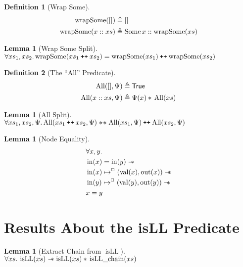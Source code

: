 \documentclass[a4paper, 10pt]{report}
\theoremstyle{definition}
\newtheorem{lemma}[theorem]{Lemma}
\newtheorem{definition}{Definition}[section]
\newcommand{\isLLchain}{\operatorname{isLL\_chain}}
\newcommand{\isLL}{\operatorname{isLL}}
\newcommand{\AllP}{\operatorname{All}}
\newcommand{\wrapsome}{\operatorname{wrapSome}}
\newcommand{\nIn}[1]{\operatorname{in}(#1)}
\newcommand{\nVal}[1]{\operatorname{val}(#1)}
\newcommand{\nOut}[1]{\operatorname{out}(#1)}
\newcommand\catenate{\mathbin{\text{\ttfamily\upshape ++}}}
\newcommand{\isNode}[1]{\nIn{#1} \mapsto^{\persistently} (\nVal{#1}, \nOut{#1})}
\begin{document}
\begin{definition}[Wrap Some]\label{COMMON:Def:wrap-some}
  \begin{align*}
    \wrapsome([]) &\eqdef []\\
    \wrapsome(x :: xs) &\eqdef \Some{x} :: \wrapsome(xs)
  \end{align*}
\end{definition}

\begin{lemma}[Wrap Some Split]\label{lemma:wrap-some-split}
  $\All xs_1, xs_2.\\
  \wrapsome(xs_1 \catenate xs_2) = \wrapsome(xs_1) \catenate \wrapsome(xs_2)$
\end{lemma}


\begin{definition}[The ``All'' Predicate]\label{COMMON:Def:All}
  \begin{align*}
    \AllP([], \Psi) &\eqdef \TRUE\\
    \AllP(x :: xs, \Psi) &\eqdef \Psi(x) \star{} \AllP(xs)
  \end{align*}
\end{definition}

\begin{lemma}[All Split]\label{lemma:all-split}
  $\All xs_1, xs_2, \Psi.\\
  \AllP(xs_1 \catenate xs_2, \Psi) \wandIff \AllP(xs_1, \Psi) \catenate \AllP(xs_2, \Psi)$
\end{lemma}


\begin{lemma}[Node Equality]\label{lemma:nIn-equal}
  \begin{align*}
    &\All x, y.\\
    &\nIn{x} = \nIn{y} \wand\\
    &\isNode{x} \wand\\
    &\isNode{y} \wand\\
    &x = y
  \end{align*}
\end{lemma}

\section{Results About the isLL Predicate}
\label{appendix:common:section:isll}

\begin{lemma}[Extract Chain from $\isLL$]\label{lemma:isLL-and-chain}
  $\All xs. \isLL(xs) \wand \isLL(xs) \star{} \isLLchain(xs)$
\end{lemma}
\end{document}
